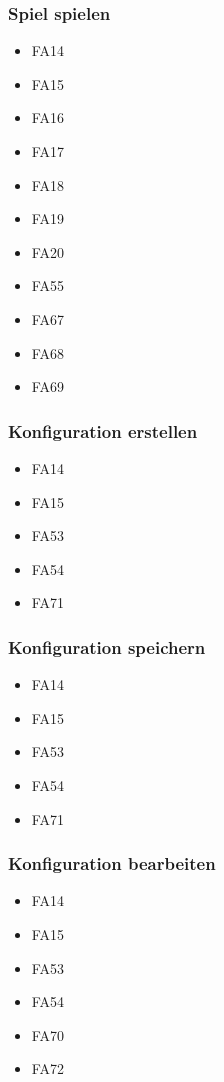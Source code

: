 \subsubsection{Spiel spielen}
\begin{itemize} 
	\item FA14 
	\item FA15 
	\item FA16 
	\item FA17 
	\item FA18 
	\item FA19 
	\item FA20 
	\item FA55 
	\item FA67
	\item FA68 
	\item FA69 
\end{itemize}
\subsubsection{Konfiguration erstellen}
\begin{itemize} 
	\item FA14
	\item FA15 
	\item FA53 
	\item FA54 
	\item FA71 
\end{itemize}
\subsubsection{Konfiguration speichern}
\begin{itemize} 
	\item FA14
	\item FA15 
	\item FA53 
	\item FA54 
	\item FA71 
\end{itemize}
\subsubsection{Konfiguration bearbeiten}
\begin{itemize} 
	\item FA14
	\item FA15 
	\item FA53 
	\item FA54 
	\item FA70 
	\item FA72 
\end{itemize}
